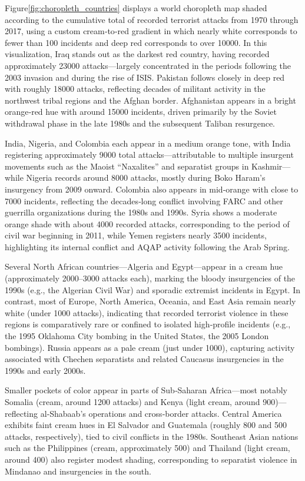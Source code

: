 Figure\ref{fig:choropleth_countries} displays a world choropleth map shaded according to the cumulative total of recorded terrorist attacks from 1970 through 2017, using a custom cream‐to‐red gradient in which nearly white corresponds to fewer than 100 incidents and deep red corresponds to over 10000. In this visualization, Iraq stands out as the darkest red country, having recorded approximately 23000 attacks—largely concentrated in the periods following the 2003 invasion and during the rise of ISIS. Pakistan follows closely in deep red with roughly 18000 attacks, reflecting decades of militant activity in the northwest tribal regions and the Afghan border. Afghanistan appears in a bright orange‐red hue with around 15000 incidents, driven primarily by the Soviet withdrawal phase in the late 1980s and the subsequent Taliban resurgence.

India, Nigeria, and Colombia each appear in a medium orange tone, with India registering approximately 9000 total attacks—attributable to multiple insurgent movements such as the Maoist “Naxalites” and separatist groups in Kashmir—while Nigeria records around 8000 attacks, mostly during Boko Haram’s insurgency from 2009 onward. Colombia also appears in mid‐orange with close to 7000 incidents, reflecting the decades‐long conflict involving FARC and other guerrilla organizations during the 1980s and 1990s. Syria shows a moderate orange shade with about 4000 recorded attacks, corresponding to the period of civil war beginning in 2011, while Yemen registers nearly 3500 incidents, highlighting its internal conflict and AQAP activity following the Arab Spring.

Several North African countries—Algeria and Egypt—appear in a cream hue (approximately 2000–3000 attacks each), marking the bloody insurgencies of the 1990s (e.g., the Algerian Civil War) and sporadic extremist incidents in Egypt. In contrast, most of Europe, North America, Oceania, and East Asia remain nearly white (under 1000 attacks), indicating that recorded terrorist violence in these regions is comparatively rare or confined to isolated high‐profile incidents (e.g., the 1995 Oklahoma City bombing in the United States, the 2005 London bombings). Russia appears as a pale cream (just under 1000), capturing activity associated with Chechen separatists and related Caucasus insurgencies in the 1990s and early 2000s.

Smaller pockets of color appear in parts of Sub‐Saharan Africa—most notably Somalia (cream, around 1200 attacks) and Kenya (light cream, around 900)—reflecting al‐Shabaab’s operations and cross‐border attacks. Central America exhibits faint cream hues in El Salvador and Guatemala (roughly 800 and 500 attacks, respectively), tied to civil conflicts in the 1980s. Southeast Asian nations such as the Philippines (cream, approximately 500) and Thailand (light cream, around 400) also register modest shading, corresponding to separatist violence in Mindanao and insurgencies in the south.

